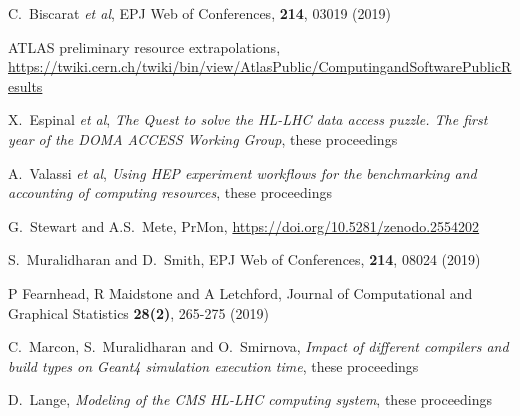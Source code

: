 \begin{thebibliography}{}

C.~Biscarat {\em et al}, EPJ Web of Conferences, \textbf{214}, 03019 (2019)

ATLAS preliminary resource extrapolations, \url{https://twiki.cern.ch/twiki/bin/view/AtlasPublic/ComputingandSoftwarePublicResults}

X.~Espinal {\em et al}, \textit{The Quest to solve the HL-LHC data access puzzle. The first year of the DOMA ACCESS Working Group}, these proceedings

A.~Valassi {\em et al}, \textit{Using HEP experiment workflows for the benchmarking and accounting of computing resources}, these proceedings

G.~Stewart and A.S.~Mete, PrMon, \url{https://doi.org/10.5281/zenodo.2554202}

S.~Muralidharan and D.~Smith, EPJ Web of Conferences, \textbf{214}, 08024 (2019)

P Fearnhead, R Maidstone and A Letchford, Journal of Computational and Graphical Statistics \textbf{28(2)}, 265-275 (2019)

C.~Marcon, S.~Muralidharan and O.~Smirnova, \textit{Impact of different compilers and build types on Geant4 simulation execution time}, these proceedings

D.~Lange, \textit{Modeling of the CMS HL-LHC computing system}, these proceedings

\end{thebibliography}
